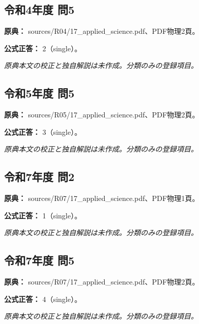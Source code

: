 \subsection{令和4年度 問5}
\label{q:r04-reg-applied-05}

\noindent\textbf{原典：} sources/R04/17\_applied\_science.pdf、PDF物理2頁。

\textbf{公式正答：} 2（single）。

\par\textit{原典本文の校正と独自解説は未作成。分類のみの登録項目。}

\subsection{令和5年度 問5}
\label{q:r05-reg-applied-05}

\noindent\textbf{原典：} sources/R05/17\_applied\_science.pdf、PDF物理2頁。

\textbf{公式正答：} 3（single）。

\par\textit{原典本文の校正と独自解説は未作成。分類のみの登録項目。}

\subsection{令和7年度 問2}
\label{q:r07-reg-applied-02}

\noindent\textbf{原典：} sources/R07/17\_applied\_science.pdf、PDF物理1頁。

\textbf{公式正答：} 1（single）。

\par\textit{原典本文の校正と独自解説は未作成。分類のみの登録項目。}

\subsection{令和7年度 問5}
\label{q:r07-reg-applied-05}

\noindent\textbf{原典：} sources/R07/17\_applied\_science.pdf、PDF物理2頁。

\textbf{公式正答：} 4（single）。

\par\textit{原典本文の校正と独自解説は未作成。分類のみの登録項目。}
